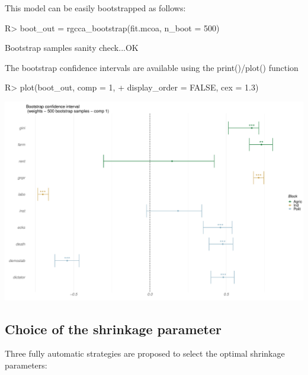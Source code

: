 \documentclass[
]{jss}
\begin{document}
\normalsize This model can be easily bootstrapped as follows:

\begin{CodeChunk}
\begin{CodeInput}
R> boot_out = rgcca_bootstrap(fit.mcoa, n_boot = 500)
\end{CodeInput}
\begin{CodeOutput}
Bootstrap samples sanity check...OK
\end{CodeOutput}
\end{CodeChunk}

The bootstrap confidence intervals are available using the
print()/plot() function

\footnotesize

\begin{CodeChunk}
\begin{CodeInput}
R> plot(boot_out, comp = 1,
+      display_order = FALSE, cex = 1.3)
\end{CodeInput}


\begin{center}\includegraphics{RGCCA_files/figure-latex/unnamed-chunk-19-1} \end{center}

\end{CodeChunk}

\normalsize

\hypertarget{choice-of-the-shrinkage-parameter}{%
\subsection{Choice of the shrinkage
parameter}\label{choice-of-the-shrinkage-parameter}}

Three fully automatic strategies are proposed to select the optimal
shrinkage parameters:
\end{document}
